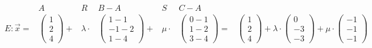 \[
\begin{array}{lcccccl}
& A & R & B-A & S & C-A
\\
E: \vec{x} =
  & \begin{pmatrix}
    1 \\ 2 \\ 4
  \end{pmatrix} +
  & \lambda \cdot 
  & \begin{pmatrix}
    1 - 1 \\ -1 - 2 \\ 1 - 4
  \end{pmatrix}  +
  & \mu \cdot 
  & \begin{pmatrix}
    0 - 1 \\ 1 - 2 \\ 3 - 4
  \end{pmatrix} 
  =
  & \begin{pmatrix}
    1 \\ 2 \\ 4
  \end{pmatrix} +
  \lambda \cdot \begin{pmatrix}
    0 \\ -3 \\ -3
  \end{pmatrix}  +
  \mu \cdot \begin{pmatrix}
    -1 \\ -1 \\ -1
  \end{pmatrix} 

\end{array}
\]

